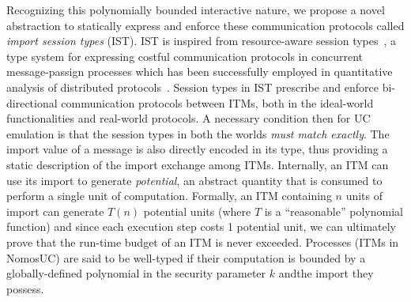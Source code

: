 
Recognizing this polynomially bounded interactive nature, we propose a novel abstraction to statically express and enforce these
communication protocols called \emph{import session types} (IST).
IST is inspired from resource-aware session types~\cite{das2018work}, a type system for expressing costful communication protocols
in concurrent message-passign processes which has been successfully employed in quantitative analysis of distributed
protocols~\cite{dasnomos,Das20FSCD,Das22LMCS,Das20arxiv}.
Session types in IST prescribe and enforce bi-directional communication protocols between ITMs, both in the ideal-world functionalities and real-world protocols.
A necessary condition then for UC emulation is that the session types in both the worlds \emph{must match exactly}.
The import value of a message is also directly encoded in its type, thus providing a static description of the import exchange
among ITMs.
Internally, an ITM can use its import to generate \emph{potential}, an abstract quantity that is consumed to perform a single
unit of computation.
Formally, an ITM containing $n$ units of import can generate $T(n)$ potential units (where $T$ is a ``reasonable'' polynomial function)
and since each execution step costs 1 potential unit, we can ultimately prove that the run-time budget of an ITM is never exceeded.
Processes (ITMs in NomosUC) are said to be well-typed if their computation is bounded by a globally-defined polynomial in the security parameter $k$ andthe import they possess.


